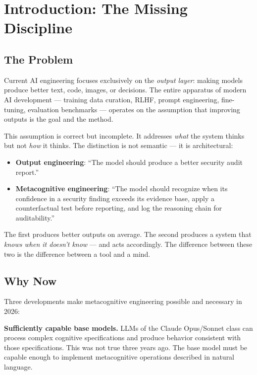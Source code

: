 \documentclass[12pt,a4paper]{article}
\theoremstyle{plain}
\theoremstyle{definition}
\theoremstyle{remark}
\begin{document}
\tableofcontents
\newpage

\section{Introduction: The Missing Discipline}

\subsection{The Problem}

Current AI engineering focuses exclusively on the \emph{output layer}: making models produce better text, code, images, or decisions. The entire apparatus of modern AI development --- training data curation, RLHF, prompt engineering, fine-tuning, evaluation benchmarks --- operates on the assumption that improving outputs is the goal and the method.

This assumption is correct but incomplete. It addresses \emph{what} the system thinks but not \emph{how} it thinks. The distinction is not semantic --- it is architectural:

\begin{itemize}[nosep]
\item \textbf{Output engineering}: ``The model should produce a better security audit report.''
\item \textbf{Metacognitive engineering}: ``The model should recognize when its confidence in a security finding exceeds its evidence base, apply a counterfactual test before reporting, and log the reasoning chain for auditability.''
\end{itemize}

The first produces better outputs on average. The second produces a system that \emph{knows when it doesn't know} --- and acts accordingly. The difference between these two is the difference between a tool and a mind.

\subsection{Why Now}

Three developments make metacognitive engineering possible and necessary in 2026:

\textbf{Sufficiently capable base models.} LLMs of the Claude Opus/Sonnet class can process complex cognitive specifications and produce behavior consistent with those specifications. This was not true three years ago. The base model must be capable enough to implement metacognitive operations described in natural language.
\end{document}
